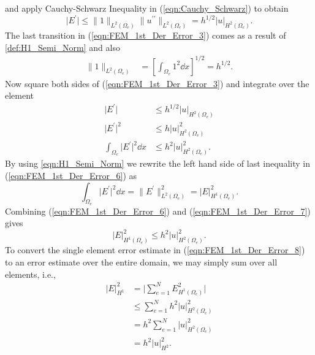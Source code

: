 and apply Cauchy-Schwarz Inequality in (\ref{eqn:Cauchy_Schwarz}) to obtain
\begin{equation}	\label{eqn:FEM_1st_Der_Error_3}
	\Big \vert E^\prime \Big \vert \leq \Big\| 1 \Big\|_{ L^2 \left( \Omega_e \right) }
		\Big\| u^{\prime \prime} \Big\|_{ L^2 \left( \Omega_e \right) }	= h^{ 1/2 } \Big \vert u \Big \vert_{ H^2 \left( \Omega_e \right) }.
\end{equation}
The last transition in (\ref{eqn:FEM_1st_Der_Error_3}) comes as a result of \cref{def:H1_Semi_Norm} and also
\begin{align*}
	\Big\| 1 \Big\|_{ L^2 \left( \Omega_e \right) } &= \left[ \int_{\Omega_e} 1^2 \dd x \right]^{1/2} = h^{1/2}.
\end{align*}
Now square both sides of (\ref{eqn:FEM_1st_Der_Error_3}) and integrate over the element
\begin{equation}	\label{eqn:FEM_1st_Der_Error_6}
	\begin{aligned}
		\Big \vert E^\prime \Big \vert &\leq h^{ 1/2 } \Big \vert u \Big \vert_{ H^2 \left( \Omega_e \right) }	\\
		\Big \vert E^\prime \Big \vert^2 &\leq h \Big \vert u \Big \vert_{ H^2 \left( \Omega_e \right) }^2	\\
		\int_{ \Omega_e } \Big \vert E^\prime \Big \vert^2 \dd x &\leq h^2 \Big \vert u \Big \vert_{ H^2 \left( \Omega_e \right) }^2.	
	\end{aligned}
\end{equation}
By using \cref{eqn:H1_Semi_Norm} we rewrite the left hand side of last inequality in (\ref{eqn:FEM_1st_Der_Error_6}) as
\begin{equation}	\label{eqn:FEM_1st_Der_Error_7}
	\int_{ \Omega_e } \Big \vert E^\prime \Big \vert^2 \dd x = \Big\| E^{ \prime } \Big\|_{ L^2 \left( \Omega_e \right) }^2
		= \Big \vert E \Big \vert_{ H^1 \left( \Omega_e \right) }^2.
\end{equation}
Combining (\ref{eqn:FEM_1st_Der_Error_6}) and (\ref{eqn:FEM_1st_Der_Error_7}) gives
\begin{equation}	\label{eqn:FEM_1st_Der_Error_8}
	\Big \vert E \Big \vert_{ H^1 \left( \Omega_e \right) }^2 \leq h^2 \Big \vert u \Big \vert_{ H^2 \left( \Omega_e \right) }^2.
\end{equation}
To convert the single element error estimate in (\ref{eqn:FEM_1st_Der_Error_8}) to an error estimate over the entire
domain, we may simply sum over all elements, i.e.,
\begin{equation}	\label{eqn:FEM_1st_Der_Error_9}
	\begin{aligned}
		\Big \vert E \Big \vert_{ H^1 }^2 &= \bigg \vert \sum_{e = 1}^N E_{ H^1 \left( \Omega_e \right) }^2 \bigg \vert	\\
		&\leq \sum_{e = 1}^N h^2 \Big \vert u \Big \vert_{ H^2 \left( \Omega_e \right) }^2	\\
		&= h^2 \sum_{e = 1}^N \Big \vert u \Big \vert_{ H^2 \left( \Omega_e \right) }^2	\\
		&= h^2 \Big \vert u \Big \vert_{ H^2 }^2.
	\end{aligned}
\end{equation}
